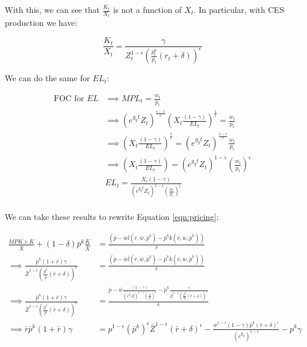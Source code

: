 \documentclass[letterpaper,12pt]{article}
\theoremstyle{definition}
\begin{document}
\begin{spacing}{1.5}
With this, we can see that $\frac{K_{t}}{X_{t}}$ is not a function of $X_{t}$. In particular, with CES production we have: 

\begin{equation}
\frac{K_{t}}{X_{t}} = \frac{\gamma}{Z_{t}^{1-\epsilon}\left(\frac{p^{k}_{t}}{p_{t}}(r_{t}+\delta)\right)^{\epsilon}}
\end{equation} 

We can do the same for $EL_{t}$:

\begin{equation}
\begin{split}
\text{FOC for $EL$}& \implies MPL_{t} = \frac{w_{t}}{p_{t}}\\
& \implies \left(e^{g_{y}t}Z_{t}\right)^{\frac{\epsilon-1}{\epsilon}}\left(X_{t}\frac{(1-\gamma)}{EL_{t}}\right)^{\frac{1}{\epsilon}} = \frac{w_{t}}{p_{t}} \\
& \implies \left(X_{t}\frac{(1-\gamma)}{EL_{t}}\right)^{\frac{1}{\epsilon}} =  \left(e^{g_{y}t}Z_{t}\right)^{\frac{1-\epsilon}{\epsilon}}\frac{w_{t}}{p_{t}} \\
& \implies \left(X_{t}\frac{(1-\gamma)}{EL_{t}}\right)=  \left(e^{g_{y}t}Z_{t}\right)^{1-\epsilon}\left(\frac{w_{t}}{p_{t}}\right)^{\epsilon} \\
& EL_{t}=  \frac{X_{t}(1-\gamma)}{\left(e^{g_{y}t}Z_{t}\right)^{1-\epsilon}\left(\frac{w_{t}}{p_{t}}\right)^{\epsilon}} \\
\end{split}
\end{equation}


We can take these results to rewrite Equation \ref{eqn:pricing}:

\begin{equation}
\label{eqn:pricing_final}
\begin{split}
 \frac{\overline{MPK} \times \bar{K}}{\bar{X}} + (1-\delta)\bar{p}^{k}\frac{\bar{K}}{\bar{X}} & =  \frac{\left(\bar{p} - \bar{w}\bar{l}(\bar{r},\bar{w},\bar{p}^{k}) - \bar{p}^{k}\bar{k}(\bar{r},\bar{w},\bar{p}^{k})\right)}{\bar{r}} \\
 \implies \frac{ \bar{p}^{k}(1+\bar{r})\gamma}{\bar{Z}^{1-\epsilon}\left(\frac{\bar{p}^{k}}{\bar{p}}(\bar{r}+\delta)\right)^{\epsilon}} & = \frac{\left(\bar{p} - \bar{w}\bar{l}(\bar{r},\bar{w},\bar{p}^{k}) - \bar{p}^{k}\bar{k}(\bar{r},\bar{w},\bar{p}^{k})\right)}{\bar{r}}  \\
  \implies \frac{ \bar{p}^{k}(1+\bar{r})\gamma}{\bar{Z}^{1-\epsilon}\left(\frac{\bar{p}^{k}}{\bar{p}}(\bar{r}+\delta)\right)^{\epsilon}} & = \frac{\bar{p} - \bar{w} \frac{(1-\gamma)}{\left(e^{g_{y}}\bar{Z}\right)^{1-\epsilon}\left(\frac{\bar{w}}{\bar{p}}\right)^{\epsilon}}  - \bar{p}^{k}\frac{\gamma}{\bar{Z}^{1-\epsilon}\left(\frac{\bar{p}^{k}}{p_{k}}(\bar{r}+\delta)\right)^{\epsilon}}}{\bar{r}} \\
  \implies \bar{r}\bar{p}^{k}(1+\bar{r})\gamma & = p^{1-\epsilon}\left(\bar{p}^{k}\right)^{\epsilon}\bar{Z}^{1-\epsilon}(\bar{r}+\delta)^{\epsilon} - \frac{\bar{w}^{1-\epsilon}(1-\gamma)\bar{p}^{k}(\bar{r}+\delta)^{\epsilon}}{\left(e^{g_{y}}\right)^{1-\epsilon}} - p^{k}\gamma
  \end{split}
\end{equation} 


\end{spacing}
\end{document}
